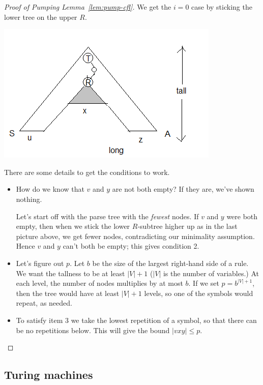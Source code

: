 \begin{proof}[Proof of Pumping Lemma~\ref{lem:pump-cfl}]
We get the $i=0$ case by sticking the lower tree on the upper $R$.

\begin{center}
\includegraphics{5-3b}
\end{center}

There are some details to get the conditions to work.
\begin{itemize}
\item
How do we know that $v$ and $y$ are not both empty? If they are, we've shown nothing.

Let's start off with the parse tree with the {\it fewest} nodes. If $v$ and $y$ were both empty, then when we stick the lower $R$-subtree higher up as in the last picture above, we get fewer nodes, contradicting our minimality assumption. Hence $v$ and $y$ can't both be empty; this gives condition 2. 
\item
Let's figure out $p$. Let $b$ be the size of the largest right-hand side of a rule. We want the tallness to be at least $|V|+1$ ($|V|$ is the number of variables.) At each level, the number of nodes multiplies by at most $b$. If we set $p=b^{|V|+1}$, then the tree would have at least $|V|+1$ levels, so one of the symbols would repeat, as needed.
\item
To satisfy item 3 we take the lowest repetition of a symbol, so that there can be no repetitions below. This will give the bound $|vxy|\le p$.
\end{itemize}







\end{proof}

\subsection{Turing machines}

